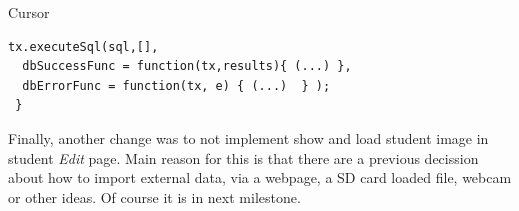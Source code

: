 \begin{bclogo}[couleur=blue!30,arrondi=0.1,ombre=true ] 
{Cursor\label{cursor}}
\begin{verbatim}
tx.executeSql(sql,[],
  dbSuccessFunc = function(tx,results){ (...) },        
  dbErrorFunc = function(tx, e) { (...)  } );
 }
\end{verbatim}
\end{bclogo}


Finally, another change was to not implement show and load student image in student \emph{Edit} page.
Main reason for this is that there are a previous decission about how to import external data, via
a webpage, a SD card loaded file, webcam or other ideas. Of course it is in next milestone.
      
  		
